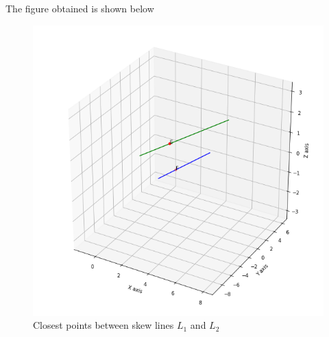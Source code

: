 \documentclass[journal,12pt,twocolumn]{IEEEtran}
\begin{document}
The figure obtained is shown below
\begin{figure}[h!]
\centering
\includegraphics[width=\columnwidth]{closest.png}
\caption{Closest points between skew lines $L_1$ and $L_2$}
\label{myfig}
\end{figure}
\end{document}
